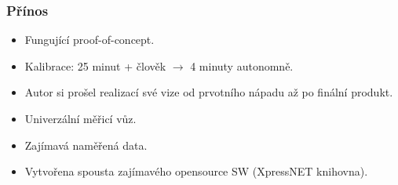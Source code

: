 \documentclass[aspectratio=169]{beamer}
\begin{document}

\begin{frame}
\frametitle{Přínos}
\begin{itemize}
\item Fungující proof-of-concept.
\item Kalibrace: 25 minut + člověk $\rightarrow$ 4 minuty autonomně.
\item Autor si prošel realizací své vize od prvotního nápadu až po finální produkt.
\item Univerzální měřicí vůz.
\item Zajímavá naměřená data.
\item Vytvořena spousta zajímavého opensource SW (XpressNET knihovna).
\end{itemize}
\end{frame}

\end{document}
